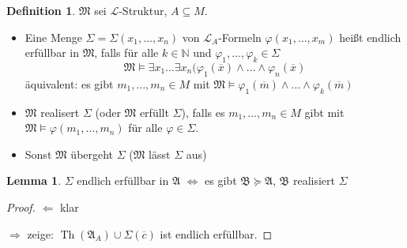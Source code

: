 \documentclass[12pt,parskip=full]{scrartcl}
\newcommand{\setN}{\mathbb{N}}
\newcommand{\heading}{\underline}
\theoremstyle{definition}
\newtheorem{lemma}[theorem]{Lemma}
\newtheorem{definition}[theorem]{Definition}
\begin{document}
 	\begin{definition}
 		$\mathfrak{M}$ sei $\mathcal{L}$-Struktur, $A \subseteq M$.
 		
 		\begin{itemize}
 			\item Eine Menge $\Sigma = \Sigma(x_1, \dots, x_n)$ von $\mathcal{L}_A$-Formeln $\varphi(x_1, \dots, x_m)$ heißt endlich erfüllbar in $\mathfrak{M}$, falls für alle $k \in \setN$ und $\varphi_1, \dots, \varphi_k \in \Sigma$
 			\begin{equation*}
	 			\mathfrak{M} \models \exists x_1 \dots \exists x_n(\varphi_1(\overline{x}) \land \dots \land \varphi_n(\overline{x})
	 		\end{equation*}
 			äquivalent: es gibt $m_1, \dots, m_n \in M$ mit $\mathfrak{M} \models \varphi_1(\overline{m}) \land \dots \land \varphi_k(\overline{m})$
 			\item $\mathfrak{M}$ realisert $\Sigma$ (oder $\mathfrak{M}$ erfüllt $\Sigma$), falls es $m_1, \dots, m_n \in M$ gibt mit $\mathfrak{M} \models \varphi(m_1, \dots, m_n)$ für alle $\varphi \in \Sigma$.
 			\item Sonst $\mathfrak{M}$ übergeht $\Sigma$ ($\mathfrak{M}$ lässt $\Sigma$ aus)
 		\end{itemize}
 	\end{definition}
 
 	\begin{lemma}
 		$\Sigma$ endlich erfüllbar in $\mathfrak{A}$ $\Leftrightarrow$ es gibt $\mathfrak{B} \succcurlyeq \mathfrak{A}$, $\mathfrak{B}$ realisiert $\Sigma$
 	\end{lemma}
 
 	\begin{proof}
 		\heading{$\Leftarrow$} klar
 		
 		\heading{$\Rightarrow$} zeige: $\operatorname{Th}(\mathfrak{A}_A) \cup \Sigma(\overline{c})$ ist endlich erfüllbar.
 	\end{proof}
 
\end{document}
